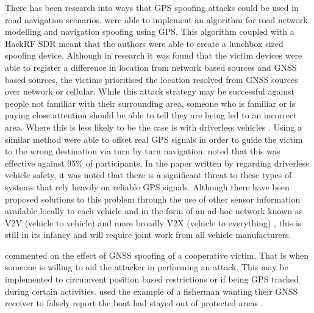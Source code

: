 There has been research into ways that GPS spoofing attacks could be used in road navigation scenarios. \citeauthor{RN9} were able to implement an algorithm for road
network modelling and navigation spoofing using GPS. This algorithm coupled with a HackRF SDR meant that the authors were able to create a lunchbox sized spoofing device.
Although in research it was found that the victim devices were able to register a difference in location from network based sources and GNSS based sources, the victims
prioritised the location resolved from GNSS sources over network or cellular.
While this attack strategy may be successful against people not familiar with their surrounding area, someone who is familiar or is paying close attention should be able
to tell they are being led to an incorrect area. Where this is less likely to be the case is with driverless vehicles \cite{RN9}.
Using a similar method \textcite{RN58} were able to offset real GPS signals in order to guide the victim to the wrong destination via turn by turn navigation.
\citeauthor{RN58} noted that this was effective against 95\% of participants. 
In the paper written by \citeauthor{RN25} \cite{RN25} regarding driverless vehicle safety, it was noted that there is a significant threat to these types
of systems that rely heavily on reliable GPS signals. Although there have been proposed solutions to this problem through the use of 
other sensor information available locally to each vehicle and in the form of an ad-hoc network known as V2V (vehicle to vehicle) and more broadly
V2X (vehicle to everything) \cite{RN17}, this is still in its infancy and will require joint work from all vehicle manufacturers. 

\citeauthor{RN12} commented on the effect of GNSS spoofing of a cooperative victim. That is when someone is willing to aid the attacker
in performing an attack. This may be implemented to circumvent position based restrictions or if being GPS tracked during certain activities.
\citeauthor{RN12} used the example of a fisherman wanting their GNSS receiver to falsely report the boat had stayed out of protected areas \cite{RN12}.

